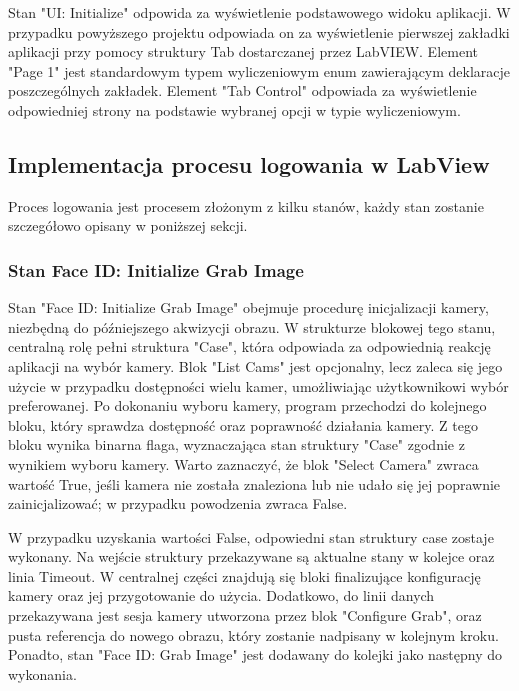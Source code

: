 \documentclass{report}
\begin{document}
Stan "UI: Initialize" odpowida za wyświetlenie podstawowego widoku aplikacji. W przypadku powyższego projektu odpowiada on za wyświetlenie 
pierwszej zakładki aplikacji przy pomocy struktury Tab dostarczanej przez LabVIEW. 
Element "Page 1" jest standardowym typem wyliczeniowym enum zawierającym deklaracje poszczególnych zakładek. 
Element "Tab Control" odpowiada za wyświetlenie odpowiedniej strony na podstawie wybranej opcji w typie wyliczeniowym.


\subsection{\Large Implementacja procesu logowania w LabView}
Proces logowania jest procesem złożonym z kilku stanów, każdy stan zostanie szczegółowo opisany w poniższej sekcji. 

\subsubsection{\large Stan Face ID: Initialize Grab Image}
Stan "Face ID: Initialize Grab Image" obejmuje procedurę inicjalizacji kamery, niezbędną do późniejszego akwizycji obrazu. W strukturze blokowej tego stanu, centralną rolę pełni struktura "Case", która odpowiada za odpowiednią reakcję aplikacji na wybór kamery. Blok "List Cams" jest opcjonalny, lecz zaleca się jego użycie w przypadku dostępności wielu kamer, umożliwiając użytkownikowi wybór preferowanej. Po dokonaniu wyboru kamery, program przechodzi do kolejnego bloku, który sprawdza dostępność oraz poprawność działania kamery. Z tego bloku wynika binarna flaga, wyznaczająca stan struktury "Case" zgodnie z wynikiem wyboru kamery. Warto zaznaczyć, że blok "Select Camera" zwraca wartość True, jeśli kamera nie została znaleziona lub nie udało się jej poprawnie zainicjalizować; w przypadku powodzenia zwraca False.

W przypadku uzyskania wartości False, odpowiedni stan struktury case zostaje wykonany. Na wejście struktury przekazywane są aktualne stany w kolejce oraz linia Timeout. W centralnej części znajdują się bloki finalizujące konfigurację kamery oraz jej przygotowanie do użycia. Dodatkowo, do linii danych przekazywana jest sesja kamery utworzona przez blok "Configure Grab", oraz pusta referencja do nowego obrazu, który zostanie nadpisany w kolejnym kroku. Ponadto, stan "Face ID: Grab Image" jest dodawany do kolejki jako następny do wykonania.

%
\end{document}
